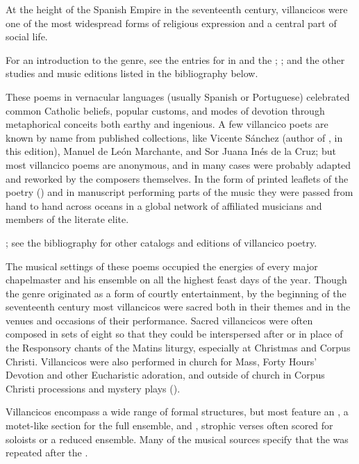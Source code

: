 At the height of the Spanish Empire in the seventeenth century,
villancicos were one of the most widespread forms of religious expression and a 
central part of social life.%
  \begin{Footnote}
      For an introduction to the genre, see the entries for  in 
       and the ; \autocites{Laird:VC}{Knighton-Torrente:VCs};
      and the other studies and music editions listed in the bibliography below.
  \end{Footnote}
These poems in vernacular languages (usually Spanish or Portuguese) celebrated 
common Catholic beliefs, popular customs, and modes of devotion through 
metaphorical conceits both earthy and ingenious.
A few villancico poets are known by name from published collections, like
Vicente Sánchez (author of , in this edition),
Manuel de León Marchante, and Sor Juana Inés de la Cruz; but most villancico
poems are anonymous, and in many cases were probably adapted and reworked by the
composers themselves.
In the form of printed leaflets of the poetry () and in 
manuscript performing parts of the music they were passed from hand to hand 
across oceans in a global network of affiliated musicians and members of the 
literate elite.%
  \begin{Footnote}
      \Autocite{BNE:VCs17C}; see the bibliography for other catalogs and
      editions of villancico poetry.
  \end{Footnote}

The musical settings of these poems occupied the energies of every major 
chapelmaster and his ensemble on all the highest feast days of the year.
Though the genre originated as a form of courtly entertainment, by the 
beginning of the seventeenth century most villancicos were sacred both in their 
themes and in the venues and occasions of their performance.
Sacred villancicos were often composed in sets of eight so that they could be 
interspersed after or in place of the Responsory chants of the Matins liturgy, 
especially at Christmas and Corpus Christi.
Villancicos were also performed in church for Mass, Forty Hours' Devotion and 
other Eucharistic adoration, and outside of church in Corpus Christi 
processions and mystery plays ().

Villancicos encompass a wide range of formal structures, but most feature an 
, a motet-like section for the full ensemble, and 
, strophic verses often scored for soloists or a reduced ensemble.
Many of the musical sources specify that the  was repeated
after the .

